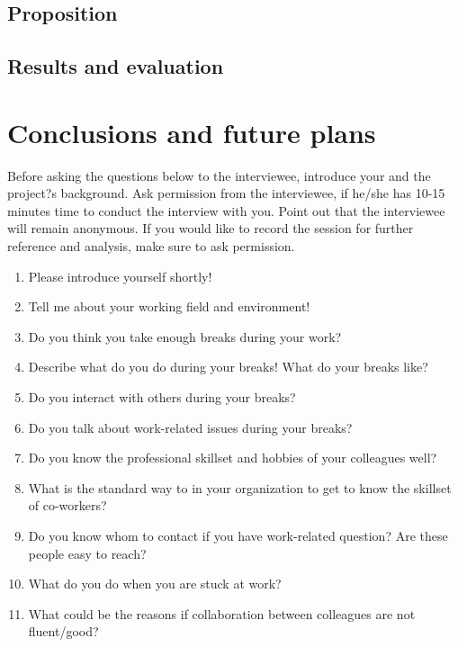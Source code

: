 \documentclass[english]{tktltiki}
\begin{document}


\subsection{Proposition}


\subsection{Results and evaluation}

\section{Conclusions and future plans}

\pagebreak
\nocite{*}




\lastpage
\appendices
\pagestyle{empty}
\singlespacing

\label{sec:interview-questions}
Before asking the questions below to the interviewee, introduce your and the project?s background. Ask permission from the interviewee, if he/she has 10-15 minutes time to conduct the interview with you. Point out that the interviewee will remain anonymous. If you would like to record the session for further reference and analysis, make sure to ask permission.

\begin{enumerate}
\item Please introduce yourself shortly!
\item Tell me about your working field and environment! 
\item Do you think you take enough breaks during your work? 
\item Describe what do you do during your breaks! What do your breaks like? 
\item Do you interact with others during your breaks? 
\item Do you talk about work-related issues during your breaks? 
\item Do you know the professional skillset and hobbies of your colleagues well?
\item What is the standard way to in your organization to get to know the skillset of co-workers? 
\item Do you know whom to contact if you have work-related question? Are these people easy to reach? 
\item What do you do when you are stuck at work? 
\item What could be the reasons if collaboration between colleagues are not fluent/good? 
\end{enumerate}
\end{document}
